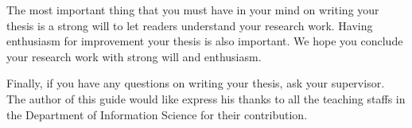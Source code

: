 \documentclass[master,english]{kuisthesis}
\def\|{\verb|}
\begin{document}
The most important thing that you must have in your mind on writing your
thesis is a strong will to let readers understand your research work.
Having enthusiasm for improvement your thesis is also important.  We hope
you conclude your research work with strong will and enthusiasm.

Finally, if you have any questions on writing your thesis, ask your
supervisor.

\acknowledgments				% Acknowledgments
The author of this guide would like express his thanks to all the teaching
staffs in the Department of Information Science for their
contribution.

\nocite{*}
			% BibTeX style
				% Output references

						% Here an appendix starts
% \Appendix[Appendix: How to Use Style File {\tt kuisthesis}]
% In order to produce a well-formatted thesis following the guidelines and
% instructions given in this guide, a \LaTeX{} style file, named \|kuisthesis|



% 
\end{document}
